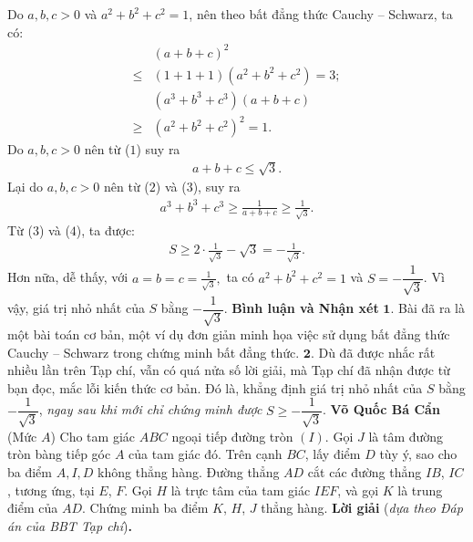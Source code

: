 \begin{multicols}{2}
	\vskip 0.05cm
	Do $a, b, c > 0$ và $a^2 + b^2 + c^2 = 1$,  nên theo bất đẳng thức Cauchy -- Schwarz, ta có:
	\begin{align*}
		&{\left( {a + b + c} \right)^2} \\
		\le &\left( {1 + 1 + 1} \right)\left( {{a^2} + {b^2} + {c^2}} \right) = 3; \tag{$1$}\\
		&\left( {{a^3} + {b^3} + {c^3}} \right)\left( {a + b + c} \right) \\
		\ge &{\left( {{a^2} + {b^2} + {c^2}} \right)^2} = 1. \tag{$2$}
	\end{align*}
	Do $a, b, c > 0$ nên từ ($1$) suy ra
	\begin{align*}
		a + b + c \le \sqrt 3 . \tag{$3$}
	\end{align*}
	Lại do $a, b, c > 0$ nên từ ($2$) và ($3$), suy ra
	\begin{align*}
		{a^3} + {b^3} + {c^3} \ge \frac{1}{{a + b + c}} \ge \frac{1}{{\sqrt 3 }}. \tag{$4$}
	\end{align*}
	Từ ($3$) và ($4$), ta được:
	\begin{align*}
		S \ge 2 \cdot \frac{1}{{\sqrt 3 }} - \sqrt 3  =  - \frac{1}{{\sqrt 3 }}.
	\end{align*}
	Hơn nữa, dễ thấy, với $a = b = c = \frac{1}{{\sqrt 3 }},$  ta có $a^2 + b^2 + c^2 = 1$  và $S = - \dfrac{1}{\sqrt{3}}$.
	\vskip 0.05cm 
	Vì vậy, giá trị nhỏ nhất của $S$ bằng  $- \dfrac{1}{\sqrt{3}}$.
	\vskip 0.05cm 
	\textbf{\color{thachthuctoanhoc}Bình luận và Nhận xét}
	\vskip 0.05cm
	$\pmb{1.}$ Bài đã ra là một bài toán cơ bản, một ví dụ đơn giản minh họa việc sử dụng bất đẳng thức Cauchy -- Schwarz trong chứng minh bất đẳng thức.
	\vskip 0.05cm
	$\pmb{2.}$ Dù đã được nhắc rất nhiều lần trên Tạp chí, vẫn có quá nửa số lời giải, mà Tạp chí đã nhận được từ bạn đọc, mắc lỗi kiến thức cơ bản. Đó là, khẳng định giá trị nhỏ nhất của $S$ bằng  $-\dfrac{1}{\sqrt{3}}$, \textit{ngay sau khi mới chỉ chứng minh được} $S \ge - \dfrac{1}{\sqrt{3}}$.  
	\vskip 0.05cm
	\hfill	\textbf{\color{thachthuctoanhoc}Võ Quốc Bá Cẩn}
	\vskip 0.1cm
	{}
	(Mức $A$) Cho tam giác $ABC$ ngoại tiếp đường tròn $(I)$. Gọi $J$ là tâm đường tròn bàng tiếp góc $A$ của tam giác đó. Trên cạnh $BC$, lấy điểm $D$ tùy ý, sao cho ba điểm $A, I, D$ không thẳng hàng. Đường thẳng $AD$ cắt các đường thẳng $IB$, $IC$, tương ứng, tại $E$, $F$. Gọi $H$ là trực tâm của tam giác $IEF$, và gọi $K$ là trung điểm của $AD$. Chứng minh ba điểm $K$, $H$, $J$ thẳng hàng.
	\vskip 0.05cm
	\textbf{\color{thachthuctoanhoc}Lời giải} (\textit{dựa theo Đáp án của BBT Tạp chí})\textbf{\color{thachthuctoanhoc}.}

\end{multicols}
